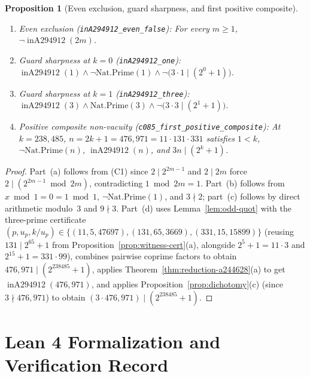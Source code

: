 \documentclass[11pt]{article}
\newtheorem{proposition}[theorem]{Proposition}
\theoremstyle{definition}
\newcommand{\inA}{\operatorname{inA294912}}
\begin{document}
\begin{proposition}[Even exclusion, guard sharpness, and first positive composite]
\label{prop:boundaries}
\mbox{}
\begin{enumerate}
\item[\textup{(a)}] \emph{Even exclusion (\texttt{inA294912\_even\_false}):} For every $m \ge 1$, $\neg\inA(2m)$.
\item[\textup{(b)}] \emph{Guard sharpness at $k = 0$ (\texttt{inA294912\_one}):} $\inA(1) \land \neg\mathrm{Nat.Prime}(1) \land \neg\bigl(3 \cdot 1 \mid (2^0 + 1)\bigr)$.
\item[\textup{(c)}] \emph{Guard sharpness at $k = 1$ (\texttt{inA294912\_three}):} $\inA(3) \land \mathrm{Nat.Prime}(3) \land \neg\bigl(3 \cdot 3 \mid (2^1 + 1)\bigr)$.
\item[\textup{(d)}] \emph{Positive composite non-vacuity (\texttt{c085\_first\_positive\_composite}):} At $k = 238{,}485$, $n = 2k + 1 = 476{,}971 = 11 \cdot 131 \cdot 331$ satisfies $1 < k$, $\neg\mathrm{Nat.Prime}(n)$, $\inA(n)$, and $3n \mid (2^k + 1)$.
\end{enumerate}
\end{proposition}

\begin{proof}
Part~(a) follows from (C1) since $2 \mid 2^{2m-1}$ and $2 \mid 2m$ force $2 \mid (2^{2m-1} \bmod 2m)$, contradicting $1 \bmod 2m = 1$. Part~(b) follows from $x \bmod 1 = 0 = 1 \bmod 1$, $\neg\mathrm{Nat.Prime}(1)$, and $3 \nmid 2$; part~(c) follows by direct arithmetic modulo~$3$ and $9 \nmid 3$. Part~(d) uses Lemma~\ref{lem:odd-quot} with the three-prime certificate $(p, u_p, k/u_p) \in \{(11, 5, 47697), (131, 65, 3669), (331, 15, 15899)\}$ (reusing $131 \mid 2^{65} + 1$ from Proposition~\ref{prop:witness-cert}(a), alongside $2^5 + 1 = 11 \cdot 3$ and $2^{15} + 1 = 331 \cdot 99$), combines pairwise coprime factors to obtain $476{,}971 \mid (2^{238485} + 1)$, applies Theorem~\ref{thm:reduction-a244628}(a) to get $\inA(476{,}971)$, and applies Proposition~\ref{prop:dichotomy}(c) (since $3 \nmid 476{,}971$) to obtain $(3 \cdot 476{,}971) \mid (2^{238485} + 1)$.
\end{proof}

\section{Lean 4 Formalization and Verification Record}
\label{sec:lean}
\end{document}
